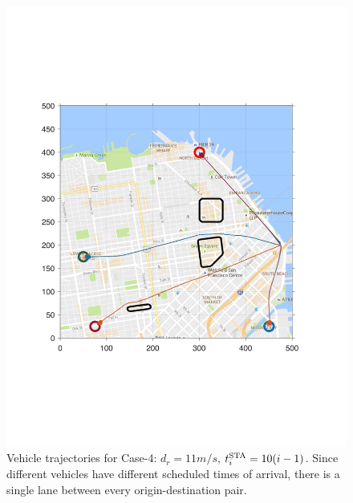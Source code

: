 \begin{figure}[t]
  \centering
  \includegraphics[width=\columnwidth]{"figs/sf_d11sep10"}
  \caption{Vehicle trajectories for Case-4: $d_r = 11m/s$, $t^\text{STA}_i = 10(i-1)$. Since different vehicles have different scheduled times of arrival, there is a single lane between every origin-destination pair.} 
  \label{fig:sf_d11sep10}
\end{figure}